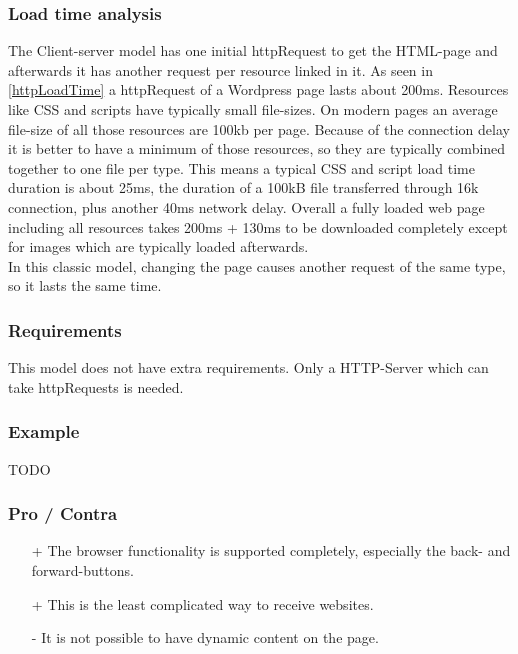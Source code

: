 \documentclass[f,bachelor,binding,twoside,palatino]{WeSTthesis}
\begin{document}
    \subsubsection{Load time analysis}
      The Client-server model has one initial \gls{httpRequest} to get the HTML-page and afterwards it has another request per resource linked in it. 
      As seen in \ref{httpLoadTime} a \gls{httpRequest} of a Wordpress page lasts about 200ms.
      Resources like CSS and scripts have typically small file-sizes.
      On modern pages an average file-size of all those resources are 100kb per page. 
      Because of the connection delay it is better to have a minimum of those resources, so they are typically combined together to one file per type.
      This means a typical CSS and script load time duration is about 25ms, the duration of a 100kB file transferred through 16k connection, plus another 40ms network delay.
      Overall a fully loaded web page including all resources takes 200ms + 130ms to be downloaded completely except for images which are typically loaded afterwards.\\
      In this classic model, changing the page causes another request of the same type, so it lasts the same time.
    
    \subsubsection{Requirements}
    This model does not have extra requirements.
    Only a HTTP-Server which can take \gls{httpRequest}s is needed.

    \subsubsection{Example}
    TODO
      
    \subsubsection{Pro / Contra}
      \begin{itemize}
  	    \item[+]{The browser functionality is supported completely, especially the back- and forward-buttons.}
  	    \item[+]{This is the least complicated way to receive websites.}
        \item[-]{It is not possible to have dynamic content on the page.}
      \end{itemize}
\end{document}
